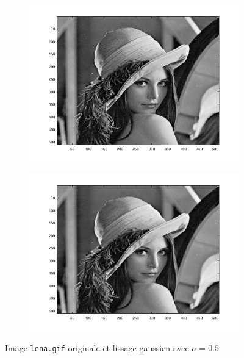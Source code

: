 \documentclass[a4paper]{article}
\begin{document}
\begin{figure}[H]
    \centering
    \begin{subfigure}[c]{0.46\textwidth}
        \centering
        \includegraphics[width=\textwidth]{images/lena.png}
    \end{subfigure}
    \begin{subfigure}[c]{0.46\textwidth}
        \centering
        \includegraphics[width=\textwidth]{images/lena_lissage.png}
    \end{subfigure}
    \caption{Image \texttt{lena.gif} originale et lissage gaussien avec
    $\sigma=0.5$}
    \label{fig:lena-lissage}
\end{figure}
\end{document}
